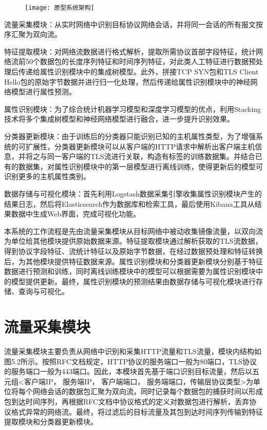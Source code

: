\begin{figure}[!h]
    \centering
    \texttt{[image: 原型系统架构]}
    \label{fig:5-1}
\end{figure}

流量采集模块：从实时网络中识别目标协议网络会话，并将同一会话的所有报文按序汇聚为双向流。

特征提取模块：对网络流数据进行格式解析，提取所需协议首部字段特征，统计网络流前50个数据包的长度序列特征和时间序列特征，对此类人工特征进行数据预处理后传递给属性识别模块中的集成树模型。此外，拼接TCP SYN包和TLS Client Hello包的原始字节数据并进行归一化处理，然后传递给属性识别模块中的神经网络模型进行属性预测。

属性识别模块：为了综合统计机器学习模型和深度学习模型的优点，利用Stacking技术将多个集成树模型和神经网络模型进行融合，进一步提升识别效果。

分类器更新模块：由于训练后的分类器只能识别已知的主机属性类型，为了增强系统的可扩展性，分类器更新模块可以从客户端的HTTP请求中解析出客户端主机信息，并将之与同一客户端的TLS流进行关联，构造有标签的训练数据集。并结合已有的数据集，对属性识别模块中的第一层模型进行离线训练，使得更新后的模型可识别更多的主机属性类别。

数据存储与可视化模块：首先利用Logstash数据采集引擎收集属性识别模块产生的结果日志，然后将Elasticsearch作为数据库和检索工具，最后使用Kibana工具从结果数据中生成Web界面，完成可视化功能。

本系统的工作流程是先由流量采集模块从目标网络中被动收集镜像流量，以双向流为单位给其他模块提供原始数据来源。特征提取模块通过解析获取的TLS流数据，得到协议字段特征、流统计特征以及原始字节数据，在经过数据预处理和特征转换后，为其他模块提供特征数据来源。属性识别模块和分类器更新模块分别基于特征数据进行预测和训练，同时离线训练模块中的模型可以根据需要为属性识别模块中的模型提供更新。最终，属性识别模块的预测结果由数据存储与可视化模块进行存储、查询与可视化。

\section{流量采集模块}

流量采集模块主要负责从网络中识别和采集HTTP流量和TLS流量，模块内结构如图5.2所示。按照RFC文档规定，HTTP协议的服务端口一般为80端口，TLS协议的服务端口一般为443端口。因此，本模块首先基于端口识别目标流量，然后以五元组<客户端IP， 服务端IP， 客户端端口， 服务端端口，传输层协议类型>为单位将每个网络会话的数据包汇聚为双向流，同时记录每个数据包的捕获时间以形成包到达时间序列，再根据RFC文档中协议格式的定义对数据包进行解析，丢弃协议格式异常的网络流。最终，将过滤后的目标流量及其包到达时间序列传输到特征提取模块和分类器更新模块。

